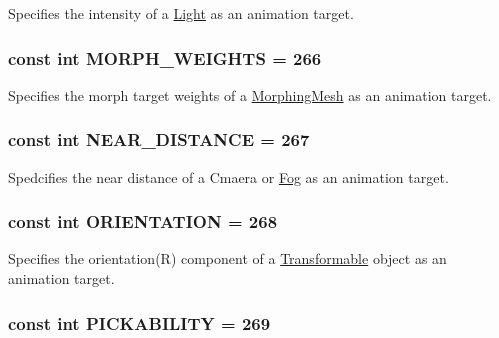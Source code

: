 Specifies the intensity of a \hyperlink{classm3g_1_1Light}{Light} as an animation target. \hypertarget{classm3g_1_1AnimationTrack_d75f3e3033e268d0a74f9533cfa9b9d6}{
\subsubsection[{MORPH\_\-WEIGHTS}]{\setlength{\rightskip}{0pt plus 5cm}const int {\bf MORPH\_\-WEIGHTS} = 266}}
\label{classm3g_1_1AnimationTrack_d75f3e3033e268d0a74f9533cfa9b9d6}


Specifies the morph target weights of a \hyperlink{classm3g_1_1MorphingMesh}{MorphingMesh} as an animation target. \hypertarget{classm3g_1_1AnimationTrack_74f49e3b52778aff378dac012e59cdb2}{
\subsubsection[{NEAR\_\-DISTANCE}]{\setlength{\rightskip}{0pt plus 5cm}const int {\bf NEAR\_\-DISTANCE} = 267}}
\label{classm3g_1_1AnimationTrack_74f49e3b52778aff378dac012e59cdb2}


Spedcifies the near distance of a Cmaera or \hyperlink{classm3g_1_1Fog}{Fog} as an animation target. \hypertarget{classm3g_1_1AnimationTrack_c7fe423a6a639520b0b3d1c1e663784b}{
\subsubsection[{ORIENTATION}]{\setlength{\rightskip}{0pt plus 5cm}const int {\bf ORIENTATION} = 268}}
\label{classm3g_1_1AnimationTrack_c7fe423a6a639520b0b3d1c1e663784b}


Specifies the orientation(R) component of a \hyperlink{classm3g_1_1Transformable}{Transformable} object as an animation target. \hypertarget{classm3g_1_1AnimationTrack_87fcd8136941a05a8a95c61e499692e0}{
\subsubsection[{PICKABILITY}]{\setlength{\rightskip}{0pt plus 5cm}const int {\bf PICKABILITY} = 269}}
\label{classm3g_1_1AnimationTrack_87fcd8136941a05a8a95c61e499692e0}


